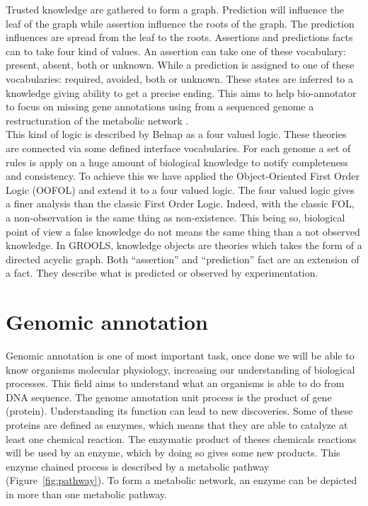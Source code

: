 \documentclass{llncs}
\begin{document}
Trusted knowledge are gathered to form a graph. Prediction will influence the leaf of the graph while assertion influence the roots of the graph. The prediction influences are spread from the leaf to the roots. Assertions and predictions facts can to take four kind of values. An assertion can take one of these vocabulary:  present, absent, both or unknown. While a prediction is assigned to one of these vocabularies: required, avoided, both or unknown. These states are inferred to a knowledge giving ability to get a precise ending. This aims to help bio-annotator to focus on missing gene annotations using from a sequenced genome a restructuration of the metabolic network \cite{francke2005reconstructing}.\\
This kind of logic is described by Belnap \cite{belnap1977useful} as a four valued logic. These theories are connected via some defined interface vocabularies. For each genome a set of rules is apply on a huge amount of biological knowledge to notify completeness and consistency. To achieve this we have applied the Object-Oriented First Order Logic (OOFOL) \cite{amir1999object} and extend it to a four valued logic. The four valued logic gives a finer analysis than the classic First Order Logic. Indeed, with the classic FOL, a non-observation is the same thing as non-existence.  This being so, biological point of view a false knowledge do not means the same thing than a not observed knowledge. In GROOLS, knowledge objects are theories which takes the form of a directed acyclic graph. Both ``assertion'' and ``prediction'' fact are an extension of a fact. They describe what is predicted or observed by experimentation.

\section{Genomic annotation}

Genomic annotation is one of most important task, once done we will be able to know organisms molecular physiology, increasing our understanding of biological processes. This field aims to understand what an organisms is able to do from DNA sequence. The genome annotation unit process is the product of gene (protein). Understanding its function can lead to new discoveries. Some of these proteins are defined as enzymes, which means that they are able to catalyze at least one chemical reaction. The enzymatic product of theses chemicals reactions will be used by an enzyme, which by doing so gives some new products. This enzyme chained process is described by a metabolic pathway (Figure~\ref{fig:pathway}). To form a metabolic network, an enzyme can be depicted in more than one metabolic pathway.
\end{document}
